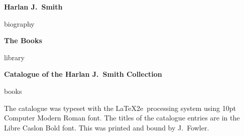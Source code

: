 \documentclass[letterpaper]{book}
\begin{document}
\vspace*{1 in}
\centerline{\Large \bf Harlan J.\ Smith}
\bigskip\bigskip
{biography}
\newpage

\vspace*{1 in}
\centerline{\Large \bf The Books}
\bigskip\bigskip
{library}
\newpage

\printbibliography

\mainmatter
\begin{center}
  {\Large \bf Catalogue of the Harlan J.\ Smith Collection}
\end{center}
\bigskip
{books}


\backmatter
\begin{colophon}
  The catalogue was typeset with the \LaTeX2e\ processing system using
  10pt Computer Modern Roman font. The titles of the catalogue entries
  are in the Libre Caslon Bold font. This was printed and
  bound by J.~Fowler.
\end{colophon}
\end{document}
